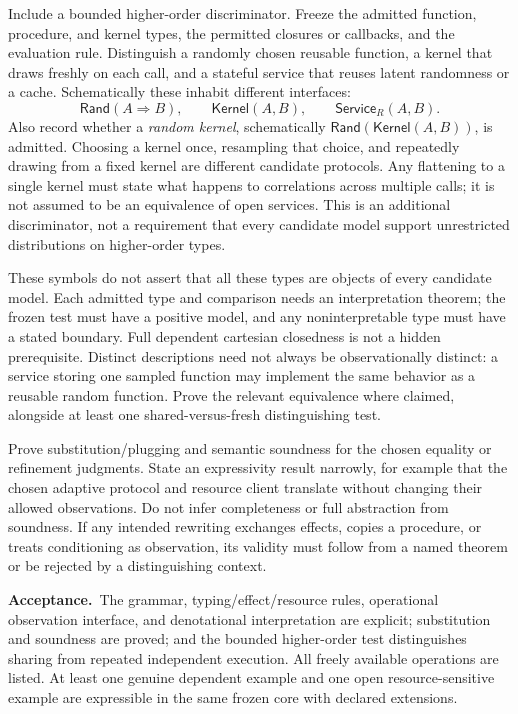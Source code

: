 \documentclass[11pt,a4paper]{article}
\newcommand{\accept}{\par\textbf{Acceptance.}\ }
\begin{document}
Include a bounded higher-order discriminator. Freeze the admitted function,
procedure, and kernel types, the permitted closures or callbacks, and the
evaluation rule. Distinguish a randomly chosen reusable function, a kernel
that draws freshly on each call, and a stateful service that reuses latent
randomness or a cache. Schematically these inhabit different interfaces:
\[
 \mathsf{Rand}(A\Rightarrow B),\qquad
 \mathsf{Kernel}(A,B),\qquad
 \mathsf{Service}_{R}(A,B).
\]
Also record whether a \emph{random kernel}, schematically
\(\mathsf{Rand}(\mathsf{Kernel}(A,B))\), is admitted. Choosing a kernel once,
resampling that choice, and repeatedly drawing from a fixed kernel are
different candidate protocols. Any flattening to a single kernel must state
what happens to correlations across multiple calls; it is not assumed to be
an equivalence of open services. This is an additional discriminator, not a
requirement that every candidate model support unrestricted distributions
on higher-order types.

These symbols do not assert that all these types are objects of every candidate
model. Each admitted type and comparison needs an interpretation theorem;
the frozen test must have a positive model, and any noninterpretable type
must have a stated boundary. Full dependent cartesian closedness is not a
hidden prerequisite. Distinct descriptions need not always be observationally
distinct: a service storing one sampled function may implement the same
behavior as a reusable random function. Prove the relevant equivalence where
claimed, alongside at least one shared-versus-fresh distinguishing test.

Prove substitution/plugging and semantic soundness for the chosen equality
or refinement judgments. State an expressivity result narrowly, for example
that the chosen adaptive protocol and resource client translate without
changing their allowed observations. Do not infer completeness or full
abstraction from soundness. If any intended rewriting exchanges effects,
copies a procedure, or treats conditioning as observation, its validity must
follow from a named theorem or be rejected by a distinguishing context.

\accept The grammar, typing/effect/resource rules, operational observation
interface, and denotational interpretation are explicit; substitution and
soundness are proved; and the bounded higher-order test distinguishes sharing
from repeated independent execution. All freely available operations are
listed. At least one genuine dependent example and one open resource-sensitive
example are expressible in the same frozen core with declared extensions.
\end{document}
